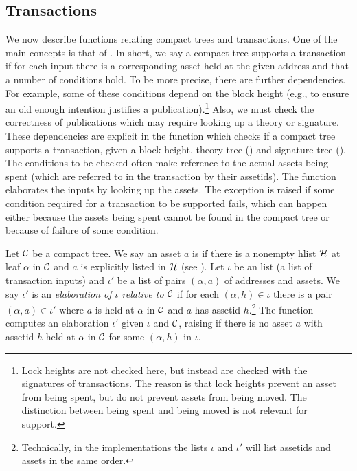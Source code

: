 \subsection{Transactions}

We now describe functions relating compact trees and transactions.
One of the main concepts is that of {}.
In short, we say a compact tree supports a transaction if for each
input there is a corresponding asset held at the given address
and that a number of conditions hold.
To be more precise, there are further dependencies.
For example, some of these conditions depend on the block height
(e.g., to ensure an old enough intention justifies a publication).\footnote{Lock heights are not checked here, but instead are checked with the signatures of transactions. The reason is that lock heights prevent an asset from being spent, but do not prevent assets from being moved. The distinction between being spent and being moved is not relevant for support.}
Also, we must check the correctness of publications
which may require looking up a theory or signature.
These dependencies
are explicit in the function {}
which checks if a compact tree supports a transaction,
given a block height, theory tree ({}) and signature tree ({}).
The conditions to be checked often make reference to the actual assets
being spent (which are referred to in the transaction by their assetids).
The function {} elaborates
the inputs by looking up the assets.
The exception {} is raised if
some condition required for a transaction to be supported fails,
which can happen either because the assets being spent cannot be found
in the compact tree or because of failure of some condition.

Let $\mathcal{C}$ be a compact tree.
We say an asset $a$ is {}
if there is a nonempty hlist $\mathcal{H}$ at leaf $\alpha$ in $\mathcal{C}$ and $a$
is explicitly listed in $\mathcal{H}$ (see {}).
Let $\iota$ be an {} list (a list of transaction inputs)
and $\iota'$ be a list of pairs $(\alpha,a)$ of addresses and assets.
We say $\iota'$ is an {\emph{elaboration of $\iota$ relative to $\mathcal{C}$}}
if for each $(\alpha,h) \in\iota$ there is a pair $(\alpha,a) \in\iota'$
where $a$ is held at $\alpha$ in $\mathcal{C}$ and $a$ has assetid $h$.\footnote{Technically, in the implementations the lists $\iota$ and $\iota'$ will list assetids and assets in the same order.}
The function {} 
computes an elaboration $\iota'$ given $\iota$ and $\mathcal{C}$,
raising {} if 
there is no asset $a$ with assetid $h$ held at $\alpha$ in $\mathcal{C}$
for some $(\alpha,h)$ in $\iota$.

